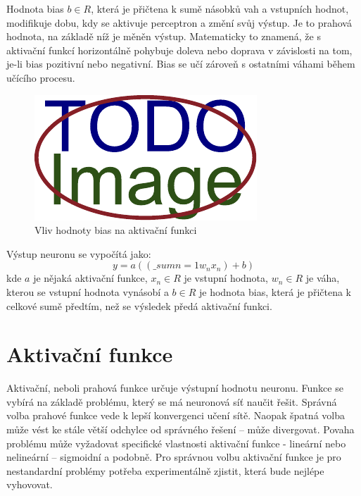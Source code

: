 Hodnota bias $b \in R$, která je přičtena k sumě násobků vah a vstupních hodnot, modifikuje dobu, kdy se aktivuje perceptron a změní svůj výstup. Je to prahová hodnota, na základě níž je měněn výstup. Matematicky to znamená, že s aktivační funkcí horizontálně pohybuje doleva nebo doprava v závislosti na tom, je-li bias pozitivní nebo negativní. Bias se učí zároveň s ostatními váhami během učícího procesu.

\begin{figure}[H]
    \centering
    \includegraphics[scale=1]{obrazky-figures/placeholder.pdf}
    \caption{\label{fig:bias}Vliv hodnoty bias na aktivační funkci}
\end{figure}

Výstup neuronu se vypočítá jako:
\begin{equation}
y = a((\_sum{n=1} w_nx_n) + b)
\end{equation}
kde $a$ je nějaká aktivační funkce, $x_n \in R$ je vstupní hodnota, $w_n \in R$ je váha, kterou se vstupní hodnota vynásobí a $b \in R$ je hodnota bias, která je přičtena k celkové sumě předtím, než se výsledek předá aktivační funkci.


\section{Aktivační funkce}
Aktivační, neboli prahová funkce určuje výstupní hodnotu neuronu. Funkce se vybírá na základě problému, který se má neuronová síť naučit řešit. Správná volba prahové funkce vede k lepší konvergenci učení sítě. Naopak špatná volba může vést ke stále větší odchylce od správného řešení -- může divergovat. Povaha problému může vyžadovat specifické vlastnosti aktivační funkce - lineární nebo nelineární -- sigmoidní a podobně. Pro správnou volbu aktivační funkce je pro nestandardní problémy potřeba experimentálně zjistit, která bude nejlépe vyhovovat.

